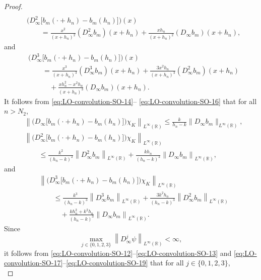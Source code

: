 \documentclass{birkjour}
\numberwithin{equation}{section}
\newcommand{\R}{\mathbb{R}}
\begin{document}
\begin{proof}
\begin{align}
\label{eq:LO-convolution-SO-14}
\\
&\big(
D_\infty^2\big[b_m(\cdot+h_n)-b_m(h_n)\big]
\big)(x)
\nonumber
\\
&
\quad\quad=
\frac{x^2}{(x+h_n)^2}
(D_\infty^2 b_m)(x+h_n)
+
\frac{xh_n}{(x+h_n)^2}(D_\infty b_m)(x+h_n),
\label{eq:LO-convolution-SO-15}
\end{align}
and
\begin{align}
&\big(
D_\infty^3\big[b_m(\cdot+h_n)-b_m(h_n)\big]
\big)(x)
\nonumber\\
&\quad\quad=
\frac{x^3}{(x+h_n)^3}
(D_\infty^3 b_m)(x+h_n)
+
\frac{3x^2h_n}{(x+h_n)^3}
(D_\infty^2 b_m)(x+h_n)
\nonumber\\
&\quad\quad\quad
+
\frac{xh_n^2-x^2h_n}{(x+h_n)^3}
(D_\infty b_m)(x+h_n).
\label{eq:LO-convolution-SO-16}
\end{align}
It follows from \eqref{eq:LO-convolution-SO-14}--%
\eqref{eq:LO-convolution-SO-16}
that for all $n>N_2$,
\begin{align}
&
\left\|\big(
D_\infty\big[b_m(\cdot+h_n)-b_m(h_n)\big]
\big)\chi_K\right\|_{L^\infty(\R)}
\le
\frac{k}{h_n-k}
\|D_\infty b_m\|_{L^\infty(\R)},
\label{eq:LO-convolution-SO-17}
\\
&
\left\|\big(
D_\infty^2\big[b_m(\cdot+h_n)-b_m(h_n)\big]
\big)\chi_K\right\|_{L^\infty(\R)}
\nonumber
\\
&\quad\quad
\le
\frac{k^2}{(h_n-k)^2}
\left\|D_\infty^2 b_m\right\|_{L^\infty(\R)}
+
\frac{kh_n}{(h_n-k)^2}
\left\|D_\infty b_m\right\|_{L^\infty(\R)},
\label{eq:LO-convolution-SO-18}
\end{align}
and
\begin{align}
&
\left\|\big(
D_\infty^3\big[b_m(\cdot+h_n)-b_m(h_n)\big]
\big)\chi_K\right\|_{L^\infty(\R)}
\nonumber\\
&\quad\quad
\le
\frac{k^3}{(h_n-k)^3}
\left\|D_\infty^3 b_m\right\|_{L^\infty(\R)}
+
\frac{3k^2h_n}{(h_n-k)^3}
\left\|D_\infty^2 b_m\right\|_{L^\infty(\R)}
\nonumber\\
&\quad\quad\quad
+
\frac{kh_n^2+k^2h_n}{(h_n-k)^3}
\left\|D_\infty b_m\right\|_{L^\infty(\R)}.
\label{eq:LO-convolution-SO-19}
\end{align}
Since
\[
\max_{j\in\{0,1,2,3\}}
\left\|D_\infty^j\psi\right\|_{L^\infty(\R)}<\infty,
\]
it follows from
\eqref{eq:LO-convolution-SO-12}--\eqref{eq:LO-convolution-SO-13} and
\eqref{eq:LO-convolution-SO-17}--\eqref{eq:LO-convolution-SO-19} that
for all $j\in\{0,1,2,3\}$,
\begin{equation}\label{eq:LO-convolution-SO-20}

\end{equation}
\end{proof}
\end{document}
